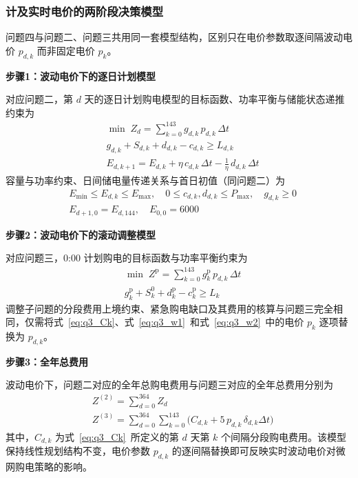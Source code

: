 
\subsubsection{计及实时电价的两阶段决策模型}

问题四与问题二、问题三共用同一套模型结构，区别只在电价参数取逐间隔波动电价 $p_{d,k}$ 而非固定电价 $p_k$。

\textbf{步骤1：波动电价下的逐日计划模型}

对应问题二，第 $d$ 天的逐日计划购电模型的目标函数、功率平衡与储能状态递推约束为
\begin{equation}
\begin{aligned}
&\min \; Z_d=\sum_{k=0}^{143} g_{d,k}\,p_{d,k}\,\Delta t\\
&g_{d,k}+S_{d,k}+d_{d,k}-c_{d,k}\geq L_{d,k}\\
&E_{d,k+1}=E_{d,k}+\eta\,c_{d,k}\,\Delta t-\frac{1}{\eta}\,d_{d,k}\,\Delta t
\end{aligned}
\end{equation}
容量与功率约束、日间储电量传递关系与首日初值（同问题二）为
\begin{equation}
\begin{aligned}
&E_{\min}\leq E_{d,k}\leq E_{\max},\quad 0\leq c_{d,k},d_{d,k}\leq P_{\max},\quad g_{d,k}\geq 0\\
&E_{d+1,0}=E_{d,144},\quad E_{0,0}=6000
\end{aligned}
\end{equation}

\textbf{步骤2：波动电价下的滚动调整模型}

对应问题三，0:00 计划购电的目标函数与功率平衡约束为
\begin{equation}
\begin{aligned}
&\min \; Z^{\mathrm{p}}=\sum_{k=0}^{143} g^{\mathrm{p}}_k\,p_{d,k}\,\Delta t\\
&g^{\mathrm{p}}_k+S^{0}_k+d^{\mathrm{p}}_k-c^{\mathrm{p}}_k\geq L_k
\end{aligned}
\end{equation}
调整子问题的分段费用上境约束、紧急购电缺口及其费用的核算与问题三完全相同，仅需将式~\eqref{eq:q3_Ck}、式~\eqref{eq:q3_w1}~和式~\eqref{eq:q3_w2}~中的电价 $p_k$ 逐项替换为 $p_{d,k}$。

\textbf{步骤3：全年总费用}

波动电价下，问题二对应的全年总购电费用与问题三对应的全年总费用分别为
\begin{equation}
\begin{aligned}
&Z^{(2)}=\sum_{d=0}^{364}Z_d\\
&Z^{(3)}=\sum_{d=0}^{364}\sum_{k=0}^{143}\Big(C_{d,k}+5\,p_{d,k}\,\delta_{d,k}\Delta t\Big)
\end{aligned}
\end{equation}
其中，$C_{d,k}$ 为式~\eqref{eq:q3_Ck}~所定义的第 $d$ 天第 $k$ 个间隔分段购电费用。该模型保持线性规划结构不变，电价参数 $p_{d,k}$ 的逐间隔替换即可反映实时波动电价对微网购电策略的影响。
